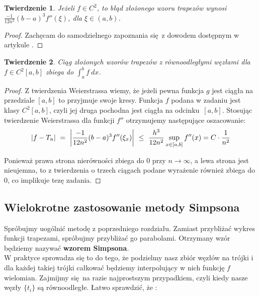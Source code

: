 \documentclass{article}
\DeclarePairedDelimiter\abs{\lvert}{\rvert}
\newtheorem{thm}{Twierdzenie}
\begin{document}
\begin{thm}
Jeżeli $f \in C^2$, to błąd złożonego wzoru trapezów wynosi $\frac{-1}{12n^2} (b-a)^3 f''(\xi)$, dla $\xi \in (a,b)$.
\end{thm}

\begin{proof}
Zachęcam do samodzielnego zapoznania się z dowodem dostępnym w artykule \cite{elemprooftrapez}.
\end{proof}

\begin{thm}
\label{thm:trapezy_zbiegaja}
Ciąg złożonych wzorów trapezów z równoodległymi węzłami dla $f \in C^{2}[a,b]$ zbiega do $\int_{a}^{b} f \ dx$.
\end{thm}

\begin{proof}

Z twierdzenia Weierstrassa wiemy, że jeżeli pewna funkcja $g$ jest ciągła na przedziale $[a,b]$ to przyjmuje swoje kresy. Funkcja $f$ podana w zadaniu jest klasy $C^2[a,b]$, czyli  jej druga pochodna jest ciągła na odcinku~$[a,b]$. Stosując twierdzenie Weierstrassa dla funkcji $f''$ otrzymujemy następujące oszacowanie:
$$
\abs*{f - T_n} \ = \ \abs*{\frac{-1}{12n^2} (b-a)^3 f''(\xi_x)} \ \leq \  \frac{h^3}{12n^2} \sup_{x \in [a,b]} f''(x) = C \cdot \frac{1}{n^2}
$$

Ponieważ prawa strona nierówności zbiega do $0$ przy $n \to \infty$, a lewa strona jest nieujemna, to z twierdzenia o trzech ciągach podane wyrażenie również zbiega do $0$, co implikuje tezę zadania.
\end{proof}


\subsection{Wielokrotne zastosowanie metody Simpsona}

Spróbujmy uogólnić metodę z poprzedniego rozdziału. Zamiast przybliżać wykres funkcji trapezami, spróbujmy przybliżać go parabolami. Otrzymany wzór będziemy nazywać \textbf{wzorem Simpsona}.\\

W praktyce sprowadza się to do tego, że podzielmy nasz zbiór węzłów na trójki i dla każdej takiej trójki całkować będziemy interpolujący w nich funkcję $f$ wielomian. Zajmijmy się na razie najprostszym przypadkiem, czyli kiedy nasze węzły $\lbrace t_i \rbrace$ są równoodległe. Łatwo sprawdzić, że :
\end{document}
